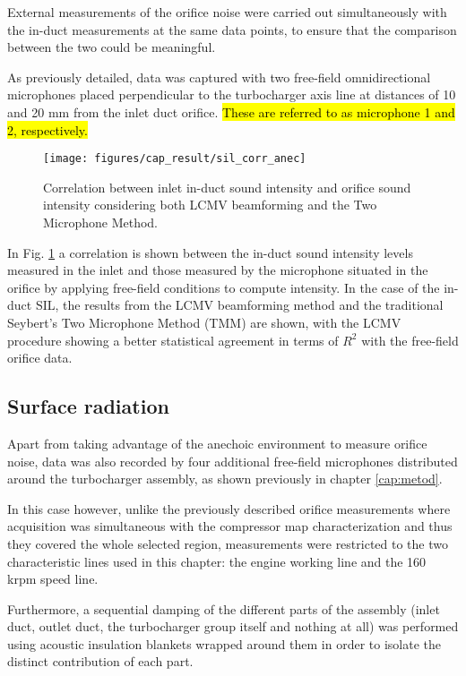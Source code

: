 External measurements of the orifice noise were carried out simultaneously with the in-duct measurements at the same data points, to ensure that the comparison between the two could be meaningful. 

As previously detailed, data was captured with two free-field omnidirectional microphones placed perpendicular to the turbocharger axis line at distances of 10 and 20 mm from the inlet duct orifice. \hl{These are referred to as microphone 1 and 2, respectively.}

\begin{figure}[tbh!]
\centering
\texttt{[image: figures/cap\_result/sil\_corr\_anec]}
\caption{Correlation between inlet in-duct sound intensity and orifice sound intensity considering both LCMV beamforming and the Two Microphone Method.}
\label{fig:sil_corr_aneic}
\end{figure}

In Fig. \ref{fig:sil_corr_aneic} a correlation is shown between the  in-duct sound intensity levels measured in the inlet and those measured by the microphone situated in the orifice by applying free-field conditions to compute intensity. In the case of the in-duct SIL, the results from the LCMV beamforming method and the traditional Seybert's \cite{seybert1988two} Two Microphone Method (TMM) are shown, with the LCMV procedure showing a better statistical agreement in terms of $R^2$ with the free-field orifice data.

\subsection{Surface radiation}

Apart from taking advantage of the anechoic environment to measure orifice noise, data was also recorded by four additional free-field microphones distributed around the turbocharger assembly, as shown previously in chapter \ref{cap:metod}.

In this case however, unlike the previously described orifice measurements where acquisition was simultaneous with the compressor map characterization and thus they covered the whole selected region, measurements were restricted to the two characteristic lines used in this chapter: the engine working line and the 160 krpm speed line.

Furthermore, a sequential damping of the different parts of the assembly (inlet duct, outlet duct, the turbocharger group itself and nothing at all) was performed using acoustic insulation blankets wrapped around them in order to isolate the distinct contribution of each part. 

